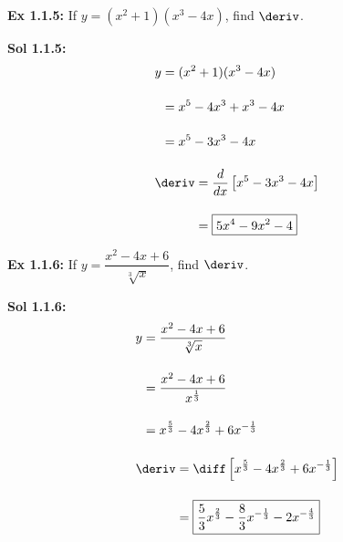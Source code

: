 \begin{tcolorbox}[example]
    \textbf{Ex 1.1.5: } If $y = (x^2 + 1)(x^3 - 4x)$, find $\deriv$. 
\end{tcolorbox}
\begin{tcolorbox}[solution]
    \textbf{Sol 1.1.5: } \begin{align*}
        & y \begin{aligned}[t]
            & = (x^2 + 1)(x^3 - 4x) \\[11pt]
            & = x^5 - 4x^3 + x^3 - 4x \\[11pt]
            & = x^5 - 3x^3 - 4x
        \end{aligned} \\[11pt]
        & \deriv \begin{aligned}[t]
            & = \frac{d}{dx}\left[x^5 - 3x^3 - 4x\right] \\[11pt]
            & = \boxed{5x^4 - 9x^2 - 4} \\
        \end{aligned}
    \end{align*} 
\end{tcolorbox} \vspace{11pt}

\begin{tcolorbox}[example]
    \textbf{Ex 1.1.6: } If $y = \dfrac{x^2 - 4x + 6}{\sqrt[3]{x}}$, find $\deriv$. 
\end{tcolorbox}
\begin{tcolorbox}[solution]
    \textbf{Sol 1.1.6: } \begin{align*}
        & y \begin{aligned}[t]
            & = \dfrac{x^2 - 4x + 6}{\sqrt[3]{x}} \\[11pt]
            & = \dfrac{x^2 - 4x + 6}{x^{\frac{1}{3}}} \\[11pt]
            & = x^{\frac{5}{3}} - 4x^{\frac{2}{3}} + 6x^{-\frac{1}{3}}
        \end{aligned} \\[11pt]
        & \deriv \begin{aligned}[t]
            & = \diff \left[x^{\frac{5}{3}} - 4x^{\frac{2}{3}} + 6x^{-\frac{1}{3}}\right] \\[11pt]
            & = \boxed{\dfrac{5}{3}x^{\frac{2}{3}} - \dfrac{8}{3}x^{-\frac{1}{3}} - 2x^{-\frac{4}{3}}}
        \end{aligned}
    \end{align*}
\end{tcolorbox}

